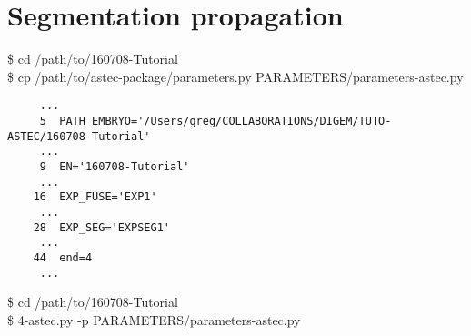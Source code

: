 \section{Segmentation propagation}


\begin{code}{0.8}
\$ cd /path/to/160708-Tutorial\\
\$ cp /path/to/astec-package/parameters.py PARAMETERS/parameters-astec.py\\
\end{code}



\begin{verbatim}
     ...
     5	PATH_EMBRYO='/Users/greg/COLLABORATIONS/DIGEM/TUTO-ASTEC/160708-Tutorial'	
     ...
     9	EN='160708-Tutorial'			
     ... 
    16	EXP_FUSE='EXP1'		
     ...
    28	EXP_SEG='EXPSEG1'
     ...
    44	end=4   
     ...
\end{verbatim}



\begin{code}{0.8}
\$ cd /path/to/160708-Tutorial\\
\$ 4-astec.py -p PARAMETERS/parameters-astec.py 
\end{code}






